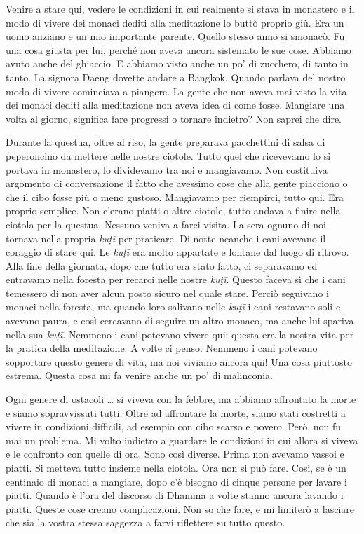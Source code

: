Venire a stare qui, vedere le condizioni in cui realmente si stava in
monastero e il modo di vivere dei monaci dediti alla meditazione lo
buttò proprio giù. Era un uomo anziano e un mio importante parente.
Quello stesso anno si smonacò. Fu una cosa giusta per lui, perché non
aveva ancora sistemato le sue cose. Abbiamo avuto anche del ghiaccio. E
abbiamo visto anche un po' di zucchero, di tanto in tanto. La signora
Daeng dovette andare a Bangkok. Quando parlava del nostro modo di vivere
cominciava a piangere. La gente che non aveva mai visto la vita dei
monaci dediti alla meditazione non aveva idea di come fosse. Mangiare
una volta al giorno, significa fare progressi o tornare indietro? Non
saprei che dire.

Durante la questua, oltre al riso, la gente preparava pacchettini di
salsa di peperoncino da mettere nelle nostre ciotole. Tutto quel che
ricevevamo lo si portava in monastero, lo dividevamo tra noi e
mangiavamo. Non costituiva argomento di conversazione il fatto che
avessimo cose che alla gente piacciono o che il cibo fosse più o meno
gustoso. Mangiavamo per riempirci, tutto qui. Era proprio semplice. Non
c'erano piatti o altre ciotole, tutto andava a finire nella ciotola per
la questua. Nessuno veniva a farci visita. La sera ognuno di noi tornava
nella propria \emph{kuṭī} per praticare. Di notte neanche i cani avevano
il coraggio di stare qui. Le \emph{kuṭī} era molto appartate e lontane
dal luogo di ritrovo. Alla fine della giornata, dopo che tutto era stato
fatto, ci separavamo ed entravamo nella foresta per recarci nelle nostre
\emph{kuṭī}. Questo faceva sì che i cani temessero di non aver alcun
posto sicuro nel quale stare. Perciò seguivano i monaci nella foresta,
ma quando loro salivano nelle \emph{kuṭī} i cani restavano soli e
avevano paura, e così cercavano di seguire un altro monaco, ma anche lui
spariva nella sua \emph{kuṭī}. Nemmeno i cani potevano vivere qui:
questa era la nostra vita per la pratica della meditazione. A volte ci
penso. Nemmeno i cani potevano sopportare questo genere di vita, ma noi
viviamo ancora qui! Una cosa piuttosto estrema. Questa cosa mi fa venire
anche un po' di malinconia.

Ogni genere di ostacoli \ldots{} si viveva con la febbre, ma abbiamo
affrontato la morte e siamo sopravvissuti tutti. Oltre ad affrontare la
morte, siamo stati costretti a vivere in condizioni difficili, ad
esempio con cibo scarso e povero. Però, non fu mai un problema. Mi volto
indietro a guardare le condizioni in cui allora si viveva e le confronto
con quelle di ora. Sono così diverse. Prima non avevamo vassoi e piatti.
Si metteva tutto insieme nella ciotola. Ora non si può fare. Così, se è
un centinaio di monaci a mangiare, dopo c'è bisogno di cinque persone
per lavare i piatti. Quando è l'ora del discorso di Dhamma a volte
stanno ancora lavando i piatti. Queste cose creano complicazioni. Non so
che fare, e mi limiterò a lasciare che sia la vostra stessa saggezza a
farvi riflettere su tutto questo.

